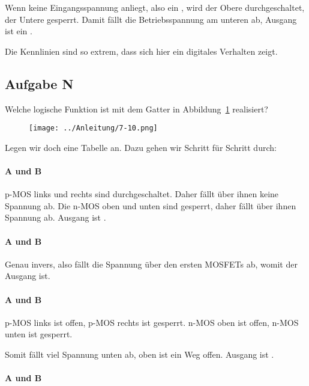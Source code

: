 Wenn keine Eingangsspannung anliegt, also ein \tlow, wird der Obere
durchgeschaltet, der Untere gesperrt. Damit fällt die Betriebsspannung am
unteren ab, Ausgang ist ein \thigh.

Die Kennlinien sind so extrem, dass sich hier ein digitales Verhalten zeigt.

\FloatBarrier
\subsection{Aufgabe N}

\begin{problem}
	Welche logische Funktion ist mit dem Gatter in Abbildung~\ref{fig:7-10}
	realisiert?
\end{problem}

\begin{figure}[htbp]
	\centering
	\texttt{[image: ../Anleitung/7-10.png]}
	\caption{%
		\cite[Abbildung~7.10]{physik313-Anleitung}
	}
	\label{fig:7-10}
\end{figure}

Legen wir doch eine Tabelle an. Dazu gehen wir Schritt für Schritt durch:

\paragraph{A und B \tlow}

p-MOS links und rechts sind durchgeschaltet. Daher fällt über ihnen keine
Spannung ab. Die n-MOS oben und unten sind gesperrt, daher fällt über ihnen
Spannung ab. Ausgang ist \thigh.

\paragraph{A und B \thigh}

Genau invers, also fällt die Spannung über den ersten MOSFETs ab, womit der
Ausgang \tlow{} ist.

\paragraph{A \thigh{} und B \tlow}

p-MOS links ist offen, p-MOS rechts ist gesperrt. n-MOS oben ist offen, n-MOS
unten ist gesperrt.

Somit fällt viel Spannung unten ab, oben ist ein Weg offen. Ausgang ist \thigh.

\paragraph{A \tlow{} und B \thigh}

